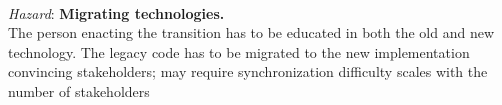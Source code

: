 \ \\
\textit{Hazard}: \textbf{Migrating technologies.} \\
The person enacting the transition has to be educated in both the old and new technology. 
The legacy code has to be migrated to the new implementation
convincing stakeholders; may require synchronization
difficulty scales with the number of stakeholders 